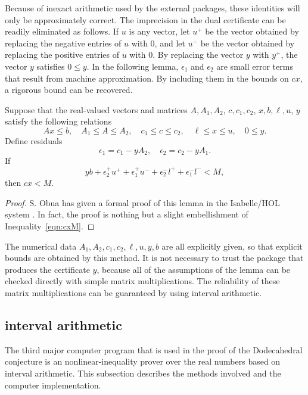 Because of inexact arithmetic used by the external packages, 
these identities will only be
approximately correct.   The imprecision in the dual
certificate can be readily eliminated as follows. If $u$ is
any vector, let $u^+$ be the vector obtained by replacing the
negative entries of $u$ with $0$, and let $u^-$ be the vector
obtained by replacing the positive entries of $u$ with $0$.
By replacing the vector $y$ with $y^+$, the vector $y$ satisfies
$0\le y$.  In the following lemma, $\epsilon_1$ and $\epsilon_2$ are
small error terms that result from machine approximation.
By including them in the bounds on $c x$, a rigorous bound
can be recovered.


\begin{lemma}  Suppose that the real-valued vectors and matrices
$A,A_1,A_2$, $c,c_1,c_2$, $x,b,\ell,u$, $y$ satisfy the following
relations
  $$
  A x\le b, \quad A_1 \le A \le A_2,
  \quad c_1 \le c \le c_2,\quad \ell\le x\le u,\quad
  0\le y.
  $$
Define residuals
  $$
   \epsilon_1 = c_1 - y A_2,\quad \epsilon_2 = c_2  - y A_1.
  $$
If
$$
y b + \epsilon_2^+ u^+ + \epsilon_1^+ u^- + \epsilon_2^- l^+ + \epsilon_1^- l^- < M,
$$
then $c x < M$.
\end{lemma}

\begin{proof}  S. Obua has given a formal proof of this lemma in
the Isabelle/HOL system \cite[3.7.2]{Ob}.  In fact, the proof is
nothing but a slight
embellishment of Inequality~\ref{eqn:cxM}.
\end{proof}

The numerical data $A_1,A_2,c_1,c_2,\ell,u,y,b$ are all explicitly given,
so that explicit bounds are obtained by this
method.  It is not necessary to trust the package
that produces the certificate $y$, because
all of the assumptions of the lemma can be checked directly with
simple matrix multiplications.  The reliability of these matrix
multiplications can be guaranteed by using interval arithmetic.


\subsection{interval arithmetic}

The third major computer program that is used in the proof of
the Dodecahedral conjecture is an nonlinear-inequality prover
over the real numbers based on interval arithmetic.  
This subsection describes the
methods involved and the computer implementation.

